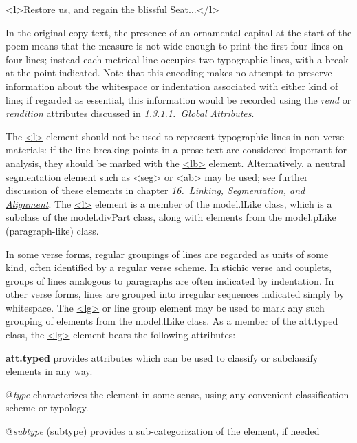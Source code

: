 \begin{shaded}
{<\textbf{l}>}Restore us, and regain the blissful Seat...{</\textbf{l}>}\end{shaded}\egroup\par \noindent  In the original copy text, the presence of an ornamental capital at the start of the poem means that the measure is not wide enough to print the first four lines on four lines; instead each metrical line occupies two typographic lines, with a break at the point indicated. Note that this encoding makes no attempt to preserve information about the whitespace or indentation associated with either kind of line; if regarded as essential, this information would be recorded using the {\itshape rend} or {\itshape rendition} attributes discussed in \textit{\hyperref[STGA]{1.3.1.1.\ Global Attributes}}.\par
The \hyperref[TEI.l]{<l>} element should not be used to represent typographic lines in non-verse materials: if the line-breaking points in a prose text are considered important for analysis, they should be marked with the \hyperref[TEI.lb]{<lb>} element. Alternatively, a neutral segmentation element such as \hyperref[TEI.seg]{<seg>} or \hyperref[TEI.ab]{<ab>} may be used; see further discussion of these elements in chapter \textit{\hyperref[SA]{16.\ Linking, Segmentation, and Alignment}}. The \hyperref[TEI.l]{<l>} element is a member of the \textsf{model.lLike} class, which is a subclass of the \textsf{model.divPart} class, along with elements from the \textsf{model.pLike} (paragraph-like) class.\par
In some verse forms, regular groupings of lines are regarded as units of some kind, often identified by a regular verse scheme. In stichic verse and couplets, groups of lines analogous to paragraphs are often indicated by indentation. In other verse forms, lines are grouped into irregular sequences indicated simply by whitespace. The \hyperref[TEI.lg]{<lg>} or line group element may be used to mark any such grouping of elements from the \textsf{model.lLike} class. As a member of the \textsf{att.typed} class, the \hyperref[TEI.lg]{<lg>} element bears the following attributes: 
\begin{sansreflist}
  
\item [\textbf{att.typed}] provides attributes which can be used to classify or subclassify elements in any way.\hfil\\[-10pt]\begin{sansreflist}
    \item[@{\itshape type}]
  characterizes the element in some sense, using any convenient classification scheme or typology.
    \item[@{\itshape subtype}]
  (subtype) provides a sub-categorization of the element, if needed
\end{sansreflist}  
\end{sansreflist}
